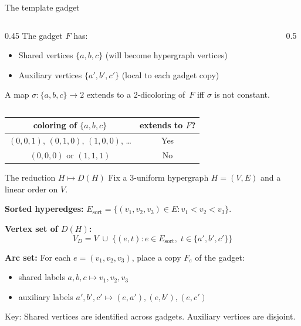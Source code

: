 \documentclass[aspectratio=169, 12pt]{beamer}
\begin{document}
\begin{frame}{The template gadget}
\begin{columns}
\begin{column}{0.45\textwidth}
The gadget $F$ has:
\begin{itemize}
	\item \alert{Shared vertices} $\{a,b,c\}$ (will become hypergraph vertices)
	\item \alert{Auxiliary vertices} $\{a',b',c'\}$ (local to each gadget copy)
\end{itemize}

\medskip

\begin{lemma}
A map $\sigma\colon\{a,b,c\}\to 2$ extends to a 2-dicoloring of~$F$ iff $\sigma$ is \alert{not constant}.
\end{lemma}
\end{column}
\begin{column}{0.5\textwidth}
	\begin{center}
		
	\end{center}
\end{column}
\end{columns}

\pause
\medskip

\begin{center}
\small
\begin{tabular}{c|c}
	coloring of $\{a,b,c\}$ & extends to $F$? \\
	\hline
	$(0,0,1)$, $(0,1,0)$, $(1,0,0)$, \ldots & \alert{Yes} \\
	$(0,0,0)$ or $(1,1,1)$ & \alert{No}
\end{tabular}
\end{center}
\end{frame}

\begin{frame}{The reduction $H \mapsto D(H)$}
Fix a 3-uniform hypergraph $H = (V, E)$ and a linear order on $V$.

\medskip

\textbf{Sorted hyperedges:} $E_{\mathrm{sort}} = \{(v_1,v_2,v_3) \in E : v_1 < v_2 < v_3\}$.

\medskip

\textbf{Vertex set of $D(H)$:}
$$
V_D = V \;\cup\; \bigl\{(e, t) : e \in E_{\mathrm{sort}},\; t \in \{a', b', c'\}\bigr\}
$$

\textbf{Arc set:} For each $e = (v_1,v_2,v_3)$, place a copy $F_e$ of the gadget:
\begin{itemize}
	\item shared labels $a, b, c \mapsto v_1, v_2, v_3$
	\item auxiliary labels $a', b', c' \mapsto (e, a'), (e, b'), (e, c')$
\end{itemize}

\medskip

\alert{Key:} Shared vertices are identified across gadgets. Auxiliary vertices are disjoint.
\end{frame}
\end{document}
